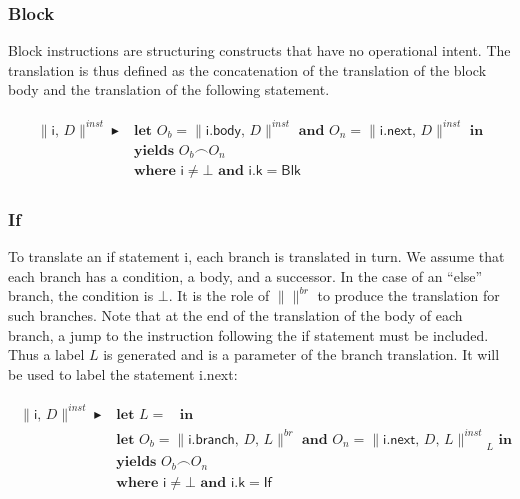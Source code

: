 \documentclass{article}
\newcommand{\trad}[2]{\ensuremath{\lVert \textsf{#1} \rVert^{\textit{#2}}}}
\DeclareMathOperator{\conc}{\smallfrown}
\DeclareMathOperator{\isdef}{\blacktriangleright}
\DeclareMathOperator{\name}{\mathcal{L}()}
\begin{document}
\subsubsection{Block}

Block instructions are structuring constructs that have no operational
intent. The translation is thus defined as the concatenation of the
translation of the block body and the translation of the following
statement.

\begin{framed}
\begin{align}
\begin{split}
  \trad{i, $D$}{inst} \isdef 
  & \textbf{let } O_b = \trad{i.body, $D$}{inst} 
  \textbf{ and } O_n = \trad{i.next, $D$}{inst} \textbf{ in} \\
  & \textbf{yields } O_b \conc O_n  \\
  & \textbf{where } \textsf{i} \ne \bot \textbf{ and } \textsf{i.k} = \textsf{Blk} 
\end{split}
\end{align}
\end{framed}

\subsubsection{If}

To translate an if statement \textsf{i}, each branch is translated in
turn. We assume that each branch has a condition, a body, and a
successor. In the case of an ``else'' branch, the condition is $\bot$.
It is the role of $\trad{}{br}$ to produce the translation for such
branches. Note that at the end of the translation of the body of each
branch, a jump to the instruction following the if statement must be
included. Thus a label $L$ is generated and is a parameter of the
branch translation. It will be used to label the statement
\textsf{i.next}:
\begin{framed}
\begin{align}
\begin{split}
  \trad{i, $D$}{inst} \isdef 
  & \textbf{let } L = \name \textbf{ in} \\
  & \textbf{let } O_b = \trad{i.branch, $D$, $L$}{br} \textbf{ and }
  O_n = \trad{i.next, $D$, $L$}{inst}_L \textbf{ in}  \\
  & \textbf{yields } O_b \conc O_n  \\
  & \textbf{where } \textsf{i} \ne \bot \textbf{ and } \textsf{i.k} = \textsf{If} 
\end{split}
\end{align}
\end{framed}
\end{document}
